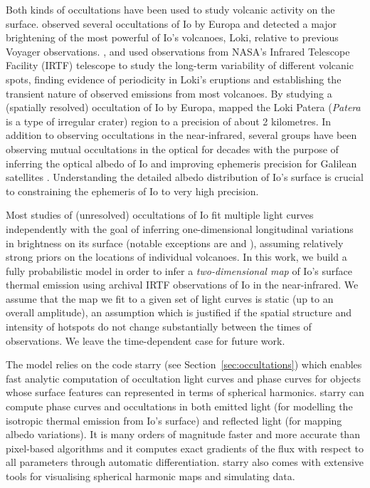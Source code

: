 \documentclass[12pt,dvipsnames]{report}
\begin{document}
Both kinds of occultations have been used to study volcanic activity on the surface.
\citet{1994Icar..107..195S} observed several occultations of Io by Europa and detected a major 
brightening of the most powerful of Io's volcanoes, Loki, relative to previous Voyager 
observations.
\citet{2002GeoRL..29.1443R}, \citet{2006GeoRL..3317201R} and \citet{2010Icar..209..625R}
 used observations from NASA's 
Infrared Telescope Facility (IRTF) telescope to study the long-term variability of 
different volcanic spots, finding evidence of periodicity in Loki's eruptions and 
establishing the transient nature of observed emissions from most volcanoes. 
By studying a (spatially resolved) occultation of Io by Europa, \citet{2017Natur.545..199D} 
mapped the Loki Patera (\emph{Patera} is a type of irregular crater) region to a 
precision of about 2 kilometres.
In addition to observing occultations in the near-infrared, several groups have been 
observing mutual occultations in the optical for decades with the purpose of inferring 
the optical albedo of Io and improving ephemeris precision for Galilean satellites 
\citep[][and references therein]{1974A&A....35..115A,2009Natur.459..957L,2018MNRAS.474.4730S,2016MNRAS.460.4086M}.
Understanding the detailed albedo distribution of Io's surface is crucial to 
constraining the ephemeris of Io to very high precision.

Most studies of (unresolved) occultations of Io fit multiple light curves independently 
with the goal of inferring one-dimensional longitudinal variations in brightness on 
its surface (notable exceptions are \citet{1994Icar..107..195S} and 
\citet{2017Natur.545..199D}), assuming relatively strong priors on the locations of 
individual volcanoes.
In this work, we build a fully probabilistic model in order to infer a 
\emph{two-dimensional map} of Io's surface thermal emission using archival IRTF 
observations of Io in the near-infrared. We assume that the map we fit to a given set 
of light curves is static (up to an overall amplitude), an assumption which is 
justified if the spatial structure and intensity of hotspots do not change substantially  
between the times of observations. We leave the time-dependent case for future work.

The model relies on the code \textsf{starry} (see Section~\ref{sec:occultations})
which enables fast analytic computation 
of occultation light curves and phase curves for objects whose surface features can 
represented in terms of spherical harmonics.
\textsf{starry} can compute phase curves and occultations in both emitted light (for 
modelling the isotropic thermal emission from Io's surface) and reflected light (for 
mapping albedo variations).
It is many orders of magnitude faster and more accurate than pixel-based algorithms 
and it computes exact gradients of the flux with respect to all parameters through 
automatic differentiation.
\textsf{starry} also comes with extensive tools for visualising spherical harmonic 
maps and simulating data.
\end{document}
